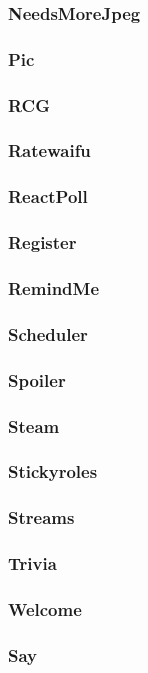 \subsubsection{NeedsMoreJpeg}

\subsubsection{Pic}

\subsubsection{RCG}

\subsubsection{Ratewaifu}

\subsubsection{ReactPoll}

\subsubsection{Register}

\subsubsection{RemindMe}

\subsubsection{Scheduler}

\subsubsection{Spoiler}

\subsubsection{Steam}

\subsubsection{Stickyroles}

\subsubsection{Streams}

\subsubsection{Trivia}

\subsubsection{Welcome}

\subsubsection{Say}

